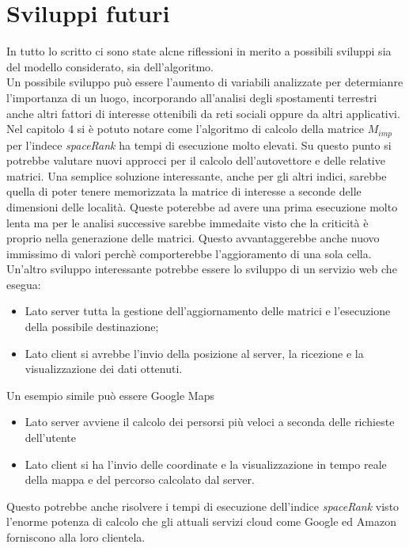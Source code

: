 \section{Sviluppi futuri}
In tutto lo scritto ci sono state alcne riflessioni in merito a possibili sviluppi
sia del modello considerato, sia dell'algoritmo.\\
Un possibile sviluppo pu\`o essere l'aumento di variabili analizzate per determianre
l'importanza di un luogo, incorporando all'analisi degli spostamenti terrestri anche
altri fattori di interesse ottenibili da reti sociali oppure da altri applicativi.\\
Nel capitolo 4 si \`e potuto notare come l'algoritmo di calcolo della matrice $M_{imp}$
per l'indece \textit{spaceRank} ha tempi di esecuzione molto elevati. Su questo punto
si potrebbe valutare nuovi approcci per il calcolo dell'autovettore e delle relative
matrici. Una semplice soluzione interessante, anche per gli altri indici, sarebbe quella
di poter tenere memorizzata la matrice di interesse a seconde delle dimensioni delle localit\`a.
Queste poterebbe ad avere una prima esecuzione molto lenta ma per le analisi successive sarebbe
immedaite visto che la criticit\`a \`e proprio nella generazione delle matrici.
Questo avvantaggerebbe anche nuovo immissimo di valori perch\`e comporterebbe l'aggioramento
di una sola cella.
Un'altro sviluppo interessante potrebbe essere lo sviluppo di un servizio web che esegua:
\begin{itemize}
\item Lato server tutta la gestione dell'aggiornamento delle matrici e l'esecuzione della possibile destinazione;
\item Lato client si avrebbe l'invio della posizione al server, la ricezione e la visualizzazione dei dati ottenuti.
\end{itemize}
Un esempio simile pu\`o essere Google Maps
\begin{itemize}
\item Lato server avviene il calcolo dei persorsi pi\`u veloci a seconda delle richieste dell'utente
\item Lato client si ha l'invio delle coordinate e la visualizzazione in tempo reale della mappa e del percorso calcolato dal server.
\end{itemize}
Questo potrebbe anche risolvere i tempi di esecuzione dell'indice \textit{spaceRank} visto
l'enorme potenza di calcolo che gli attuali servizi cloud come Google ed Amazon forniscono alla loro clientela.
